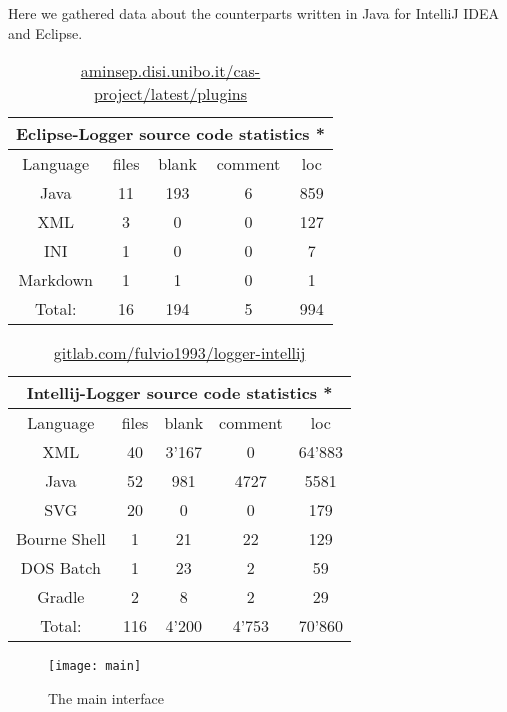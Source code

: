 \documentclass[a4paper,10pt]{report}
\begin{document}
Here we gathered data about the counterparts written in Java for IntelliJ IDEA and Eclipse.

\begin{table} [h]
	\centering
	\begin{tabular}{|c | c | c | c | c |}
	\hline
	\multicolumn{5}{|c|}{Eclipse-Logger source code statistics *}\\
	\hline
	Language & files & blank & comment & loc \\ [0.5ex] 
	\hline\hline
	Java & 11 & 193 & 6 & 859\\
	\hline
	XML & 3 & 0 & 0 & 127\\
	\hline
	INI & 1 & 0 & 0 & 7\\
	\hline
	Markdown & 1 & 1 & 0 & 1\\
	\hline
	\hline
	Total: & 16 & 194 & 5 & 994\\ [1ex]
	\hline
	\end{tabular}
	\caption{\href{http://aminsep.disi.unibo.it/cas-project/latest/plugins/EclipseLogger_1.0.0.201901141717.jar}{aminsep.disi.unibo.it/cas-project/latest/plugins}}
\end{table}

\begin{table} [h]
	\centering
	\begin{tabular}{|c | c | c | c | c|}
	\hline
	\multicolumn{5}{|c|}{Intellij-Logger source code statistics *}\\
	\hline
	Language & files & blank & comment & loc \\ [0.5ex] 
	\hline\hline
	XML & 40 & 3'167 & 0 & 64'883\\
	\hline
	Java & 52 & 981 & 4727 & 5581\\
	\hline
	SVG & 20 & 0 & 0 & 179\\
	\hline
	Bourne Shell & 1 & 21 & 22 & 129\\
	\hline
	DOS Batch & 1 & 23 & 2 & 59\\
	\hline
	Gradle & 2 & 8 & 2 & 29\\
	\hline
	\hline
	Total: & 116 & 4'200 & 4'753 & 70'860\\ [1ex]
	\hline
	\end{tabular}
	\caption{\href{https://gitlab.com/fulvio1993/logger-intellij}{gitlab.com/fulvio1993/logger-intellij}}
\end{table}

\clearpage

\begin{figure}[h]
	\centering
	\caption{The main interface}
	\texttt{[image: main]}
	\label{fig:main}
\end{figure}
\end{document}
